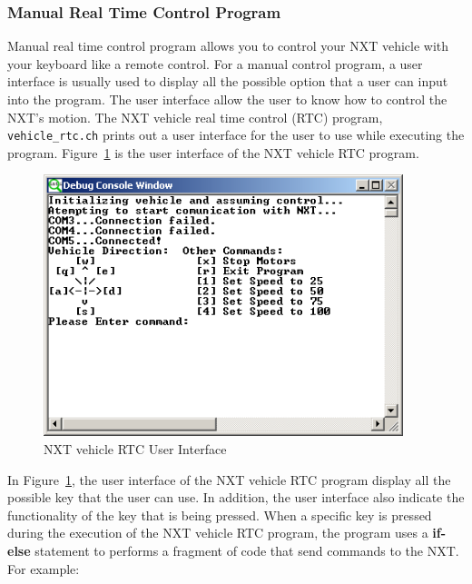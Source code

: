 \documentclass[11pt]{article}
\begin{document}
\subsubsection{Manual Real Time Control Program}
Manual real time control program allows you to control your NXT vehicle with 
your keyboard like a remote control. For a manual control program, a user interface 
is usually used to display all the possible option that a user can input into 
the program. The user interface allow the user to know how to control the NXT's 
motion. The NXT vehicle real time control (RTC) program, {\tt vehicle\_rtc.ch}
prints out a user interface for the user to use while executing the program. 
Figure~\ref{fig_NXT_GUI} is the user interface of the NXT vehicle RTC program.\\
\begin{figure}[h]
  \begin{center}
    \includegraphics[height=3in]{figure/mindstorm/RTC_GUI.png}
    \caption{NXT vehicle RTC User Interface \label{fig_NXT_GUI}}
  \end{center}
\end{figure}
In Figure~\ref{fig_NXT_GUI}, the user interface of the NXT vehicle RTC program 
display all the possible key that the user can use. In addition, the user 
interface also indicate the functionality of the key that is being pressed. When 
a specific key is pressed during the execution of the NXT vehicle RTC program, 
the program uses a {\bf if-else} statement to performs a fragment of 
code that send commands to the NXT. For example:\\
\end{document}
